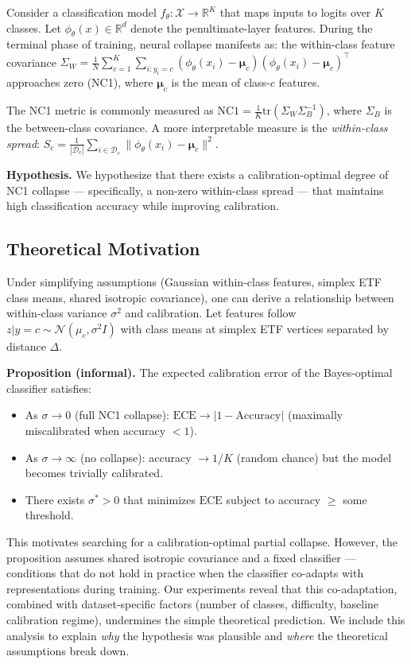 \documentclass{article}
\newcommand{\ece}{\text{ECE}}
\newcommand{\reals}{\mathbb{R}}
\begin{document}
Consider a classification model $f_\theta: \mathcal{X} \to \reals^K$ that maps inputs to logits over $K$ classes. Let $\phi_\theta(x) \in \reals^d$ denote the penultimate-layer features. During the terminal phase of training, neural collapse manifests as: the within-class feature covariance $\Sigma_W = \frac{1}{N}\sum_{c=1}^{K}\sum_{i: y_i=c} (\phi_\theta(x_i) - \boldsymbol{\mu}_c)(\phi_\theta(x_i) - \boldsymbol{\mu}_c)^\top$ approaches zero (NC1), where $\boldsymbol{\mu}_c$ is the mean of class-$c$ features.

The NC1 metric is commonly measured as $\text{NC1} = \frac{1}{K}\text{tr}(\Sigma_W \Sigma_B^{-1})$, where $\Sigma_B$ is the between-class covariance. A more interpretable measure is the \emph{within-class spread}: $S_c = \frac{1}{|\mathcal{D}_c|}\sum_{i \in \mathcal{D}_c} \|\phi_\theta(x_i) - \boldsymbol{\mu}_c\|^2$.

\textbf{Hypothesis.} We hypothesize that there exists a calibration-optimal degree of NC1 collapse --- specifically, a non-zero within-class spread --- that maintains high classification accuracy while improving calibration.

\subsection{Theoretical Motivation}

Under simplifying assumptions (Gaussian within-class features, simplex ETF class means, shared isotropic covariance), one can derive a relationship between within-class variance $\sigma^2$ and calibration. Let features follow $z | y=c \sim \mathcal{N}(\mu_c, \sigma^2 I)$ with class means at simplex ETF vertices separated by distance $\Delta$.

\textbf{Proposition (informal).} The expected calibration error of the Bayes-optimal classifier satisfies:
\begin{itemize}
    \item As $\sigma \to 0$ (full NC1 collapse): $\ece \to |1 - \text{Accuracy}|$ (maximally miscalibrated when accuracy $< 1$).
    \item As $\sigma \to \infty$ (no collapse): accuracy $\to 1/K$ (random chance) but the model becomes trivially calibrated.
    \item There exists $\sigma^* > 0$ that minimizes $\ece$ subject to accuracy $\geq$ some threshold.
\end{itemize}

This motivates searching for a calibration-optimal partial collapse. However, the proposition assumes shared isotropic covariance and a fixed classifier --- conditions that do not hold in practice when the classifier co-adapts with representations during training. Our experiments reveal that this co-adaptation, combined with dataset-specific factors (number of classes, difficulty, baseline calibration regime), undermines the simple theoretical prediction. We include this analysis to explain \emph{why} the hypothesis was plausible and \emph{where} the theoretical assumptions break down.
\end{document}
